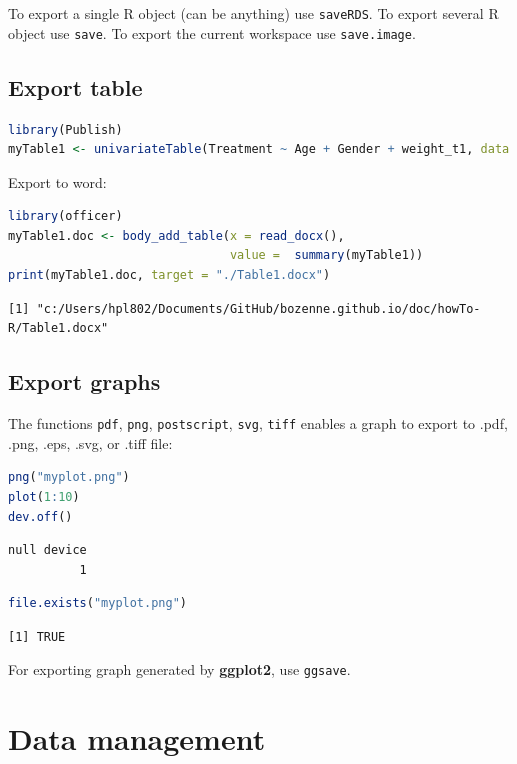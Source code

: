 \documentclass{article}
\begin{document}
To export a single R object (can be anything) use \texttt{saveRDS}.
To export several R object use \texttt{save}.
To export the current workspace use \texttt{save.image}.
\subsection{Export table}
\label{sec:orgbde93d2}

\begin{lstlisting}[language=r,numbers=none]
library(Publish)
myTable1 <- univariateTable(Treatment ~ Age + Gender + weight_t1, data = dtW.data)
\end{lstlisting}

Export to word:
\begin{lstlisting}[language=r,numbers=none]
library(officer)
myTable1.doc <- body_add_table(x = read_docx(), 
                               value =  summary(myTable1)) 
print(myTable1.doc, target = "./Table1.docx")
\end{lstlisting}

\label{}
\begin{verbatim}
[1] "c:/Users/hpl802/Documents/GitHub/bozenne.github.io/doc/howTo-R/Table1.docx"
\end{verbatim}
\subsection{Export graphs}
\label{sec:org74073f3}

The functions \texttt{pdf}, \texttt{png}, \texttt{postscript}, \texttt{svg}, \texttt{tiff} enables a graph to
export to .pdf, .png, .eps, .svg, or .tiff file:
\begin{lstlisting}[language=r,numbers=none]
png("myplot.png")
plot(1:10)
dev.off()
\end{lstlisting}

\label{}
\begin{verbatim}
null device 
          1
\end{verbatim}


\begin{lstlisting}[language=r,numbers=none]
file.exists("myplot.png")
\end{lstlisting}

\label{}
\begin{verbatim}
[1] TRUE
\end{verbatim}


For exporting graph generated by \textbf{ggplot2}, use \texttt{ggsave}.
\section{Data management}
\label{sec:org2239a55}
\end{document}
